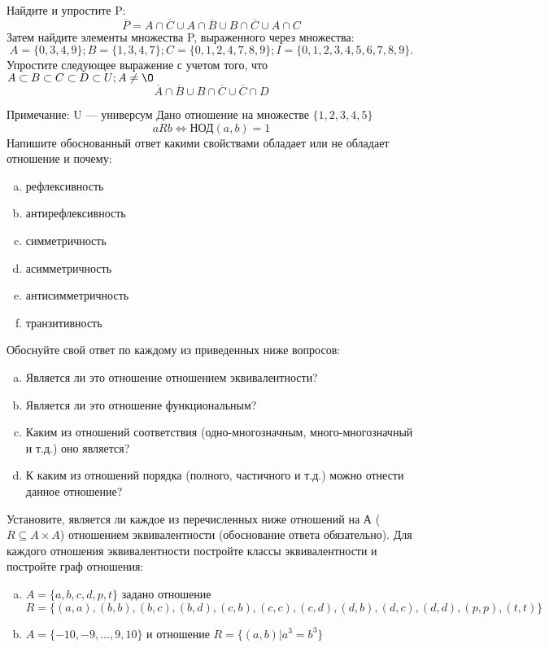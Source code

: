 \documentclass[10pt]{exam}
\begin{document}
\begin{questions}
\question
Найдите и упростите P:
\begin{equation*}
\overline{P} = A \cap \overline{C} \cup A \cap \overline{B} \cup B \cap \overline{C} \cup A \cap C
\end{equation*}
Затем найдите элементы множества P, выраженного через множества:
\begin{equation*}
A = \{0, 3, 4, 9\}; 
B = \{1, 3, 4, 7\};
C = \{0, 1, 2, 4, 7, 8, 9\};
I = \{0, 1, 2, 3, 4, 5, 6, 7, 8, 9\}.
\end{equation*}\question
Упростите следующее выражение с учетом того, что $A\subset B \subset C \subset D \subset U; A \neq \O$
\begin{equation*}
\overline{A} \cap \overline{B} \cup B \cap \overline{C} \cup \overline{C} \cap D
\end{equation*}

Примечание: U — универсум\question
Дано отношение на множестве $\{1, 2, 3, 4, 5\}$ 
\begin{equation*}
aRb \iff  \text{НОД}(a,b) =1
\end{equation*}
Напишите обоснованный ответ какими свойствами обладает или не обладает отношение и почему:   
\begin{enumerate} [a)]\setcounter{enumi}{0}
\item рефлексивность
\item антирефлексивность
\item симметричность
\item асимметричность
\item антисимметричность
\item транзитивность
\end{enumerate}

Обоснуйте свой ответ по каждому из приведенных ниже вопросов:
\begin{enumerate} [a)]\setcounter{enumi}{0}
    \item Является ли это отношение отношением эквивалентности?
    \item Является ли это отношение функциональным?
    \item Каким из отношений соответствия (одно-многозначным, много-многозначный и т.д.) оно является?
    \item К каким из отношений порядка (полного, частичного и т.д.) можно отнести данное отношение?
\end{enumerate}


\question
Установите, является ли каждое из перечисленных ниже отношений на А ($R \subseteq A \times A$) отношением эквивалентности (обоснование ответа обязательно). Для каждого отношения эквивалентности постройте классы 
эквивалентности и постройте граф отношения:
\begin{enumerate} [a)]\setcounter{enumi}{0}
\item $A = \{a, b, c, d, p, t\}$ задано отношение $R = \{(a, a), (b, b), (b, c), (b, d), (c, b), (c, c), (c, d), (d, b), (d, c), (d, d), (p,p), (t,t)\}$
\item $A = \{-10, -9, … , 9, 10\}$ и отношение $R = \{(a,b)|a^{3} = b^{3}\}$


\end{enumerate}
\end{questions}
\end{document}
